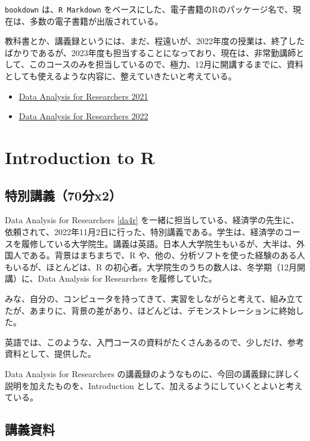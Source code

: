 \documentclass[
]{book}
\providecommand{\tightlist}{%
  \setlength{\itemsep}{0pt}\setlength{\parskip}{0pt}}
\theoremstyle{definition}
\theoremstyle{definition}
\theoremstyle{definition}
\theoremstyle{definition}
\theoremstyle{remark}
\begin{document}
\texttt{bookdown} は、\texttt{R\ Markdown} をベースにした、電子書籍のRのパッケージ名で、現在は、多数の電子書籍が出版されている。

教科書とか、講義録というには、まだ、程遠いが、2022年度の授業は、終了したばかりであるが、2023年度も担当することになっており、現在は、非常勤講師として、このコースのみを担当しているので、極力、12月に開講するまでに、資料としても使えるような内容に、整えていきたいと考えている。

\begin{itemize}
\tightlist
\item
  \href{https://icu-hsuzuki.github.io/da4r2021/}{Data Analysis for Researchers 2021}
\item
  \href{https://icu-hsuzuki.github.io/da4r2022/}{Data Analysis for Researchers 2022}
\end{itemize}

\hypertarget{intro2r}{%
\chapter{Introduction to R}\label{intro2r}}

\hypertarget{ux7279ux5225ux8b1bux7fa970ux5206x2}{%
\section{特別講義（70分x2）}\label{ux7279ux5225ux8b1bux7fa970ux5206x2}}

Data Analysis for Researchers \ref{da4r} を一緒に担当している、経済学の先生に、依頼されて、2022年11月2日に行った、特別講義である。学生は、経済学のコースを履修している大学院生。講義は英語。日本人大学院生もいるが、大半は、外国人である。背景はまちまちで、R や、他の、分析ソフトを使った経験のある人もいるが、ほとんどは、R の初心者。大学院生のうちの数人は、冬学期（12月開講）に、Data Analysis for Researchers を履修していた。

みな、自分の、コンピュータを持ってきて、実習をしながらと考えて、組み立てたが、あまりに、背景の差があり、ほどんどは、デモンストレーションに終始した。

英語では、このような、入門コースの資料がたくさんあるので、少しだけ、参考資料として、提供した。

Data Analysis for Researchers の講義録のようなものに、今回の講義録に詳しく説明を加えたものを、Introduction として、加えるようにしていくとよいと考えている。

\hypertarget{ux8b1bux7fa9ux8cc7ux6599}{%
\section{講義資料}\label{ux8b1bux7fa9ux8cc7ux6599}}
\end{document}

